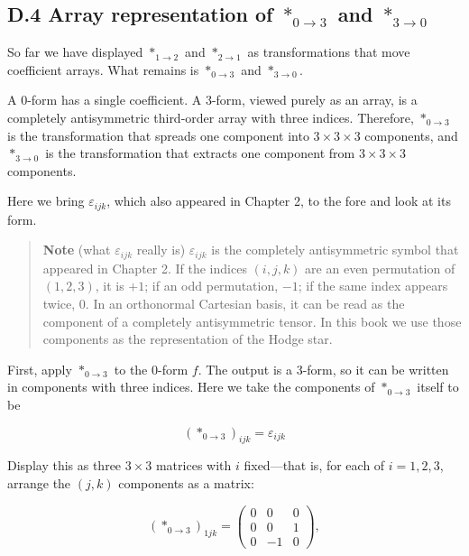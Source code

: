 \hypertarget{d.4-array-representation-of-ast_0to3-and-ast_3to0}{%
\subsection{\texorpdfstring{D.4 Array representation of \(\ast_{0\to3}\)
and
\(\ast_{3\to0}\)}{D.4 Array representation of \textbackslash ast\_\{0\textbackslash to3\} and \textbackslash ast\_\{3\textbackslash to0\}}}\label{d.4-array-representation-of-ast_0to3-and-ast_3to0}}

So far we have displayed \(\ast_{1\to2}\) and \(\ast_{2\to1}\) as
transformations that move coefficient arrays. What remains is
\(\ast_{0\to3}\) and \(\ast_{3\to0}\).

A \(0\)-form has a single coefficient. A \(3\)-form, viewed purely as an
array, is a completely antisymmetric third-order array with three
indices. Therefore, \(\ast_{0\to3}\) is the transformation that spreads
one component into \(3\times3\times3\) components, and \(\ast_{3\to0}\)
is the transformation that extracts one component from
\(3\times3\times3\) components.

Here we bring \(\varepsilon_{ijk}\), which also appeared in Chapter 2,
to the fore and look at its form.

\begin{quote}
\textbf{Note} (what \(\varepsilon_{ijk}\) really is)
\(\varepsilon_{ijk}\) is the completely antisymmetric symbol that
appeared in Chapter 2. If the indices \((i,j,k)\) are an even
permutation of \((1,2,3)\), it is \(+1\); if an odd permutation, \(-1\);
if the same index appears twice, \(0\). In an orthonormal Cartesian
basis, it can be read as the component of a completely antisymmetric
tensor. In this book we use those components as the representation of
the Hodge star.
\end{quote}

First, apply \(\ast_{0\to3}\) to the \(0\)-form \(f\). The output is a
\(3\)-form, so it can be written in components with three indices. Here
we take the components of \(\ast_{0\to3}\) itself to be

\[
(\ast_{0\to3})_{ijk}
=
\varepsilon_{ijk}
\]

Display this as three \(3\times3\) matrices with \(i\) fixed---that is,
for each of \(i=1,2,3\), arrange the \((j,k)\) components as a matrix:

\[
(\ast_{0\to3})_{1jk}
=
\begin{pmatrix}
0&0&0\\
0&0&1\\
0&-1&0
\end{pmatrix},
\]

